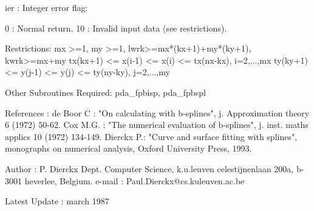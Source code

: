 \documentclass[11pt,twoside,nolof]{starlink}
\begin{document}
\begin{terminalv}
   ier   : Integer error flag:

           0 : Normal return.
          10 : Invalid input data (see restrictions).

Restrictions:
   mx >=1, my >=1, lwrk>=mx*(kx+1)+my*(ky+1), kwrk>=mx+my
   tx(kx+1) <= x(i-1) <= x(i) <= tx(nx-kx), i=2,...,mx
   ty(ky+1) <= y(j-1) <= y(j) <= ty(ny-ky), j=2,...,my

Other Subroutines Required:
   pda_fpbisp, pda_fpbspl

References :
   de Boor C : "On calculating with b-splines", j. Approximation theory
                6 (1972) 50-62.
   Cox M.G.  : "The numerical evaluation of b-splines", j. inst. maths
                applics 10 (1972) 134-149.
   Dierckx P.: "Curve and surface fitting with splines", monographs on
                 numerical analysis, Oxford University Press, 1993.

Author :
   P. Dierckx
   Dept. Computer Science, k.u.leuven
   celestijnenlaan 200a, b-3001 heverlee, Belgium.
   e-mail : Paul.Dierckx@cs.kuleuven.ac.be

Latest Update : march 1987

\end{terminalv}

\end{document}
